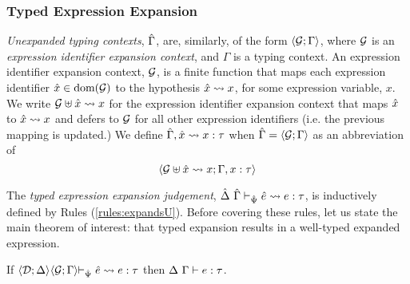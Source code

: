 \subsubsection{Typed Expression Expansion}
\emph{Unexpanded typing contexts}, $\hat{\Gamma}$, are, similarly, of the form $\langle \mathcal{G}; \Gamma \rangle$, where $\mathcal{G}$ is an \emph{expression identifier expansion context}, and $\Gamma$ is a typing context. An expression identifier expansion context, $\mathcal{G}$, is a finite function that maps each expression identifier ${\hat x} \in \text{dom}(\mathcal{G})$ to the hypothesis ${\hat x} \leadsto x$, for some expression variable, $x$. We write $\mathcal{G} \uplus {\hat x} \leadsto x$ for the expression identifier expansion context that maps ${\hat x}$ to ${\hat x} \leadsto x$ and defers to $\mathcal{G}$ for all other expression identifiers (i.e. the previous mapping is updated.) %
We define $\hat{\Gamma}, {\hat x} \leadsto x : \tau$ when $\hat{\Gamma} = \langle \mathcal{G}; \Gamma \rangle$ as an abbreviation of \[\langle \mathcal{G} \uplus {\hat x} \leadsto x; \Gamma, x : \tau \rangle\]

The \emph{typed expression expansion judgement}, $\hat{\Delta}~\hat{\Gamma} \vdash_{\hat{\Psi}} {\hat e} \leadsto e : \tau$, is inductively defined by Rules (\ref{rules:expandsU}). Before covering these rules, let us state the main theorem of interest: that typed expansion results in a well-typed expanded expression.
\begingroup
\def\thetheorem{\ref{thm:typed-expansion-short-U}}
\begin{theorem} \hspace{-3px}If $\expandsU{\uDD{\uD}{\Delta}\hspace{-3px}}{\uGG{\uG}{\Gamma}\hspace{-3px}}{\uPsi}{\ue}{e}{\tau}$ then $\Delta~\Gamma \vdash e : \tau$.
\end{theorem}
\endgroup

